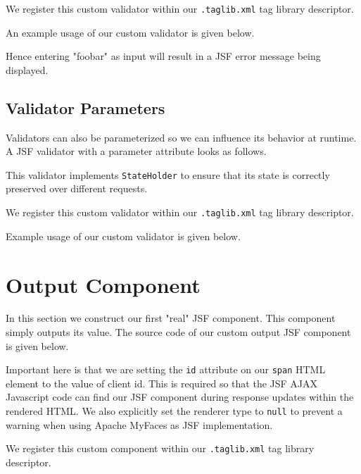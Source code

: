We register this custom validator within our \texttt{.taglib.xml} tag library descriptor.


An example usage of our custom validator is given below.

Hence entering "foobar" as input will result in a JSF error message being displayed.


\subsection{Validator Parameters}
Validators can also be parameterized so we can influence its behavior at runtime. 
A JSF  validator with a parameter attribute looks as follows.

This validator implements \texttt{StateHolder} to ensure that its state is correctly preserved over different requests.

We register this custom validator within our \texttt{.taglib.xml} tag library descriptor.


Example usage of our custom validator is given below.


\section{Output Component}
In this section we construct our first "real" JSF component.
This component simply outputs its value.
The source code of our custom output JSF component is given below.

Important here is that we are setting the \texttt{id} attribute on our \texttt{span} HTML element to the value of client id.
This is required so that the JSF AJAX Javascript code can find our JSF component during response updates within the rendered HTML.
We also explicitly set the renderer type to \texttt{null} to prevent a warning when using Apache MyFaces \cite{myfaces} as JSF implementation.

We register this custom component within our \texttt{.taglib.xml} tag library descriptor.


